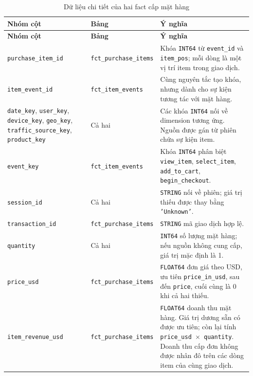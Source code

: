 \begin{xltabular}{\textwidth}{>{\raggedright\arraybackslash}p{3.6cm} >{\raggedright\arraybackslash}p{3.6cm} >{\raggedright\arraybackslash}X}
\caption{Dữ liệu chi tiết của hai fact cấp mặt hàng}
\label{tab:fct-item-details} \\
\hline
\textbf{Nhóm cột} & \textbf{Bảng} & \textbf{Ý nghĩa} \\
\hline
\endfirsthead
\hline
\textbf{Nhóm cột} & \textbf{Bảng} & \textbf{Ý nghĩa} \\
\hline
\endhead
\hline
\endfoot
\hline
\endlastfoot

\texttt{purchase\_item\_id}
& \texttt{fct\_purchase\_items}
& Khóa \texttt{INT64} từ \texttt{event\_id} và \texttt{item\_pos}; mỗi dòng là một vị trí item trong giao dịch. \\

\texttt{item\_event\_id}
& \texttt{fct\_item\_events}
& Cùng nguyên tắc tạo khóa, nhưng dành cho sự kiện tương tác với mặt hàng. \\

\texttt{date\_key}, \texttt{user\_key}, \texttt{device\_key}, \texttt{geo\_key}, \texttt{traffic\_source\_key}, \texttt{product\_key}
& Cả hai
& Các khóa \texttt{INT64} nối về dimension tương ứng. Nguồn được gán từ phiên chứa sự kiện item. \\

\texttt{event\_key}
& \texttt{fct\_item\_events}
& Khóa \texttt{INT64} phân biệt \texttt{view\_item}, \texttt{select\_item}, \texttt{add\_to\_cart}, \texttt{begin\_checkout}. \\

\texttt{session\_id}
& Cả hai
& \texttt{STRING} nối về phiên; giá trị thiếu được thay bằng \texttt{'Unknown'}. \\

\texttt{transaction\_id}
& \texttt{fct\_purchase\_items}
& \texttt{STRING} mã giao dịch hợp lệ. \\

\texttt{quantity}
& Cả hai
& \texttt{INT64} số lượng mặt hàng; nếu nguồn không cung cấp, giá trị mặc định là 1. \\

\texttt{price\_usd}
& \texttt{fct\_purchase\_items}
& \texttt{FLOAT64} đơn giá theo USD, ưu tiên \texttt{price\_in\_usd}, sau đến \texttt{price}, cuối cùng là 0 khi cả hai thiếu. \\

\texttt{item\_revenue\_usd}
& \texttt{fct\_purchase\_items}
& \texttt{FLOAT64} doanh thu mặt hàng. Giá trị dương sẵn có được ưu tiên; còn lại tính \texttt{price\_usd $\times$ quantity}. Doanh thu cấp đơn không được nhân đô trên các dòng item của cùng giao dịch. \\
\end{xltabular}

